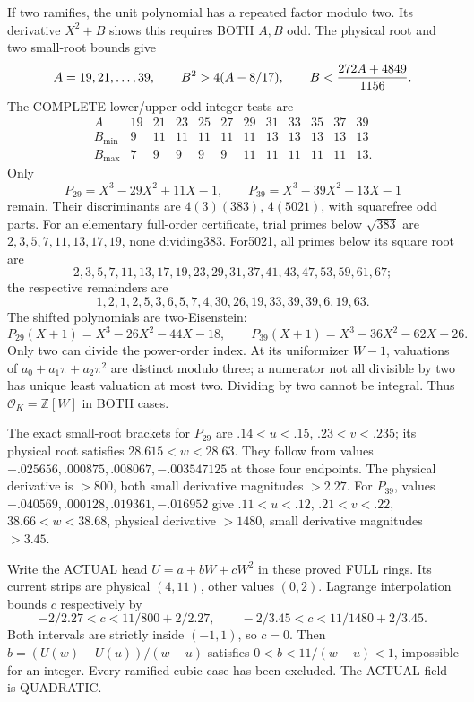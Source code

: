 If two ramifies, the unit polynomial has a
repeated factor modulo two.
Its derivative \(X^2+B\) shows this requires
BOTH \(A,B\) odd.
The physical root and two small-root bounds give
\[
 \begin{gathered}
 A=19,21,\ldots,39,\qquad
 B^2>4(A-8/17),\qquad
 B<{272A+4849\over1156}.
 \end{gathered}
\]
The COMPLETE lower/upper odd-integer tests are
\[
\begin{array}{c|rrrrrrrrrrr}
 A&19&21&23&25&27&29&31&33&35&37&39\\ \hline
 B_{\min}&9&11&11&11&11&11&13&13&13&13&13\\
 B_{\max}&7&9&9&9&9&11&11&11&11&11&13 .
\end{array}
\]
Only
\[
                   P_{29}=X^3-29X^2+11X-1,\qquad
                   P_{39}=X^3-39X^2+13X-1
\]
remain.
Their discriminants are \(4(3)(383)\),
\(4(5021)\), with squarefree odd parts.
For an elementary full-order certificate,
trial primes below \(\sqrt{383}\) are
\(2,3,5,7,11,13,17,19\), none dividing383.
For5021, all primes below its square root are
\[
2,3,5,7,11,13,17,19,23,29,31,37,41,43,47,53,59,61,67;
\]
the respective remainders are
\[
1,2,1,2,5,3,6,5,7,4,30,26,19,33,39,39,6,19,63 .
\]
The shifted polynomials are two-Eisenstein:
\[
 P_{29}(X+1)=X^3-26X^2-44X-18,\qquad
 P_{39}(X+1)=X^3-36X^2-62X-26 .
\]
Only two can divide the power-order index.
At its uniformizer \(W-1\), valuations of
\(a_0+a_1\pi+a_2\pi^2\) are distinct modulo
three; a numerator not all divisible by two
has unique least valuation at most two.
Dividing by two cannot be integral.
Thus \(\mathcal O_K=\mathbb Z[W]\) in BOTH cases.

The exact small-root brackets for \(P_{29}\)
are \(.14<u<.15\), \(.23<v<.235\);
its physical root satisfies \(28.615<w<28.63\).
They follow from values
\(-.025656,.000875,.008067,-.003547125\)
at those four endpoints.
The physical derivative is \(>800\), both
small derivative magnitudes \(>2.27\).
For \(P_{39}\), values
\(-.040569,.000128,.019361,-.016952\)
give \(.11<u<.12\), \(.21<v<.22\),
\(38.66<w<38.68\), physical derivative \(>1480\),
small derivative magnitudes \(>3.45\).

Write the ACTUAL head \(U=a+bW+cW^2\) in
these proved FULL rings.
Its current strips are physical \((4,11)\),
other values \((0,2)\).
Lagrange interpolation bounds \(c\) respectively by
\[
             -2/2.27<c<11/800+2/2.27,\qquad
             -2/3.45<c<11/1480+2/3.45 .
\]
Both intervals are strictly inside \((-1,1)\),
so \(c=0\).
Then \(b=(U(w)-U(u))/(w-u)\) satisfies
\(0<b<11/(w-u)<1\), impossible for an integer.
Every ramified cubic case has been excluded.
The ACTUAL field is QUADRATIC.

